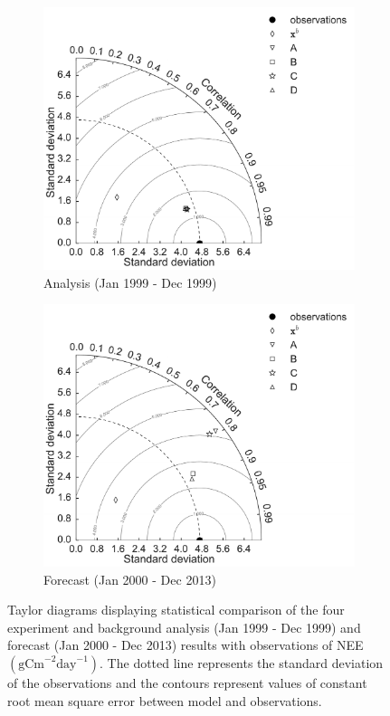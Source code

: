 \documentclass[review]{elsarticle}
\begin{document}
\begin{figure}[ht]
    \centering
    \begin{subfigure}[b]{0.49\textwidth}
        \includegraphics[width=\textwidth]{td.pdf}
        \caption{Analysis (Jan 1999 - Dec 1999)}
        \label{fig:td_a}
    \end{subfigure}
    \begin{subfigure}[b]{0.49\textwidth}
        \includegraphics[width=\textwidth]{tdf.pdf}
        \caption{Forecast (Jan 2000 - Dec 2013)}
        \label{fig:td_f}
    \end{subfigure}
    \caption{Taylor diagrams displaying statistical comparison of the four experiment and background analysis (Jan 1999 - Dec 1999) and forecast (Jan 2000 - Dec 2013) results with observations of NEE $( \text{gCm}^{-2}\text{day}^{-1})$. The dotted line represents the standard deviation of the observations and the contours represent values of constant root mean square error between model and observations.}
    \label{fig:taylordiag}
\end{figure}
\end{document}
